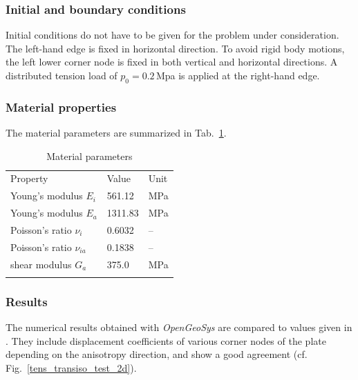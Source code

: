 \subsubsection*{Initial and boundary conditions}

Initial conditions do not have to be given for the problem under consideration. The left-hand edge is fixed in horizontal direction. To avoid rigid body motions, the left lower corner node is fixed in both vertical and horizontal directions. A distributed tension load of $p_0=0.2\,$Mpa is applied at the right-hand edge. 

\subsubsection*{Material properties}

The material parameters are summarized in Tab.~\ref{matpar_transiso_tens}.

\begin{table}[!htb]
\centering
\begin{tabular}{lll}
\hline\hline\noalign{\smallskip}
Property & Value & Unit \\
\noalign{\smallskip}\hline\noalign{\smallskip}
Young's modulus $E_i$ & 561.12 & MPa \\
Young's modulus $E_a$ & 1311.83 & MPa \\
Poisson's ratio $\nu_i$ & 0.6032 & -- \\
Poisson's ratio $\nu_{ia}$ & 0.1838 & -- \\
shear modulus $G_a$ & 375.0 & MPa \\
\noalign{\smallskip}\hline\hline
\end{tabular}
\caption{Material parameters}
\label{matpar_transiso_tens}
\end{table}

\subsubsection*{Results}

The numerical results obtained with {\sl OpenGeoSys} are compared to values given in \cite{Kohlmeier:2006}. They include displacement coefficients of various corner nodes of the plate depending on the anisotropy direction, and show a good agreement (cf. Fig.~\ref{tens_transiso_test_2d}). 

